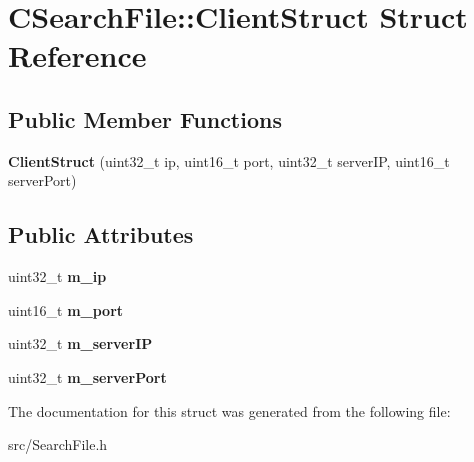 \section{CSearchFile::ClientStruct Struct Reference}
\label{structCSearchFile_1_1ClientStruct}
\subsection*{Public Member Functions}
\begin{DoxyCompactItemize}
\item 
{\bfseries ClientStruct} (uint32\_\-t ip, uint16\_\-t port, uint32\_\-t serverIP, uint16\_\-t serverPort)\label{structCSearchFile_1_1ClientStruct_a46ca891b3036690b615043882c61bdec}

\end{DoxyCompactItemize}
\subsection*{Public Attributes}
\begin{DoxyCompactItemize}
\item 
uint32\_\-t {\bfseries m\_\-ip}\label{structCSearchFile_1_1ClientStruct_a5bd74d80b70ae347720cd537bc100f21}

\item 
uint16\_\-t {\bfseries m\_\-port}\label{structCSearchFile_1_1ClientStruct_a7d4e93085dedfa3765469cdd376fd649}

\item 
uint32\_\-t {\bfseries m\_\-serverIP}\label{structCSearchFile_1_1ClientStruct_a4ac4d9e3523245886a8b369bf2e7f1c0}

\item 
uint32\_\-t {\bfseries m\_\-serverPort}\label{structCSearchFile_1_1ClientStruct_a1bbf39ddec8fc892b10482077e3c0061}

\end{DoxyCompactItemize}


The documentation for this struct was generated from the following file:\begin{DoxyCompactItemize}
\item 
src/SearchFile.h\end{DoxyCompactItemize}
